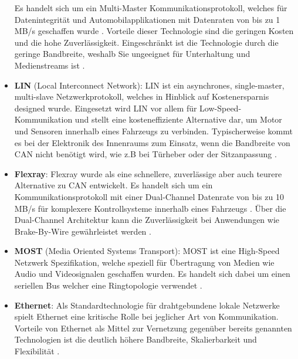 \begin{itemize}
                Es handelt sich um ein Multi-Master Kommunikationsprotokoll, welches für Datenintegrität und Automobilapplikationen mit Datenraten von bis zu 1 MB/s geschaffen wurde \cite{wolf2004security}. Vorteile
                dieser Technologie sind die geringen Kosten und die hohe Zuverlässigkeit. Eingeschränkt ist die Technologie durch die geringe Bandbreite, weshalb Sie
                ungeeignet für Unterhaltung und Medienstreams ist \cite{TW_huang2018vehicle}.
                \item \textbf{LIN} (Local Interconnect Network): LIN ist ein asynchrones, single-master, multi-slave Netzwerkprotokoll, welches in Hinblick auf Kostenersparnis 
                designed wurde. Eingesetzt wird LIN vor allem für Low-Speed-Kommunikation und stellt eine kosteneffiziente Alternative dar, um Motor und Sensoren innerhalb 
                eines Fahrzeugs zu verbinden. Typischerweise kommt es bei der Elektronik des Innenraums zum Einsatz, wenn die Bandbreite von CAN nicht benötigt wird, wie z.B bei Türheber
                oder der Sitzanpassung \cite{TW_huang2018vehicle}.
                \item \textbf{Flexray}: Flexray wurde als eine schnellere, zuverlässige aber auch teurere Alternative zu CAN entwickelt. Es handelt sich um ein Kommunikationsprotokoll mit einer
                Dual-Channel Datenrate von bis zu 10 MB/s für komplexere Kontrollsysteme innerhalb eines Fahrzeugs \cite{wolf2004security}. Über die Dual-Channel Architektur kann die Zuverlässigkeit
                bei Anwendungen wie Brake-By-Wire gewährleistet werden \cite{TW_huang2018vehicle}. 
                \item \textbf{MOST} (Media Oriented Systems Transport): MOST ist eine High-Speed Netzwerk Spezifikation, welche speziell für Übertragung von Medien wie Audio und Videosignalen 
                geschaffen wurden. Es handelt sich dabei um einen seriellen Bus welcher eine Ringtopologie verwendet \cite{TW_huang2018vehicle}.
                \item \textbf{Ethernet}: Als Standardtechnologie für drahtgebundene lokale Netzwerke spielt Ethernet eine kritische Rolle bei jeglicher Art von Kommunikation.
                Vorteile von Ethernet als Mittel zur Vernetzung gegenüber bereits genannten Technologien ist die deutlich höhere Bandbreite, Skalierbarkeit und Flexibilität \cite{hank2013automotive}\cite{TW_huang2018vehicle}. 
            \end{itemize}
